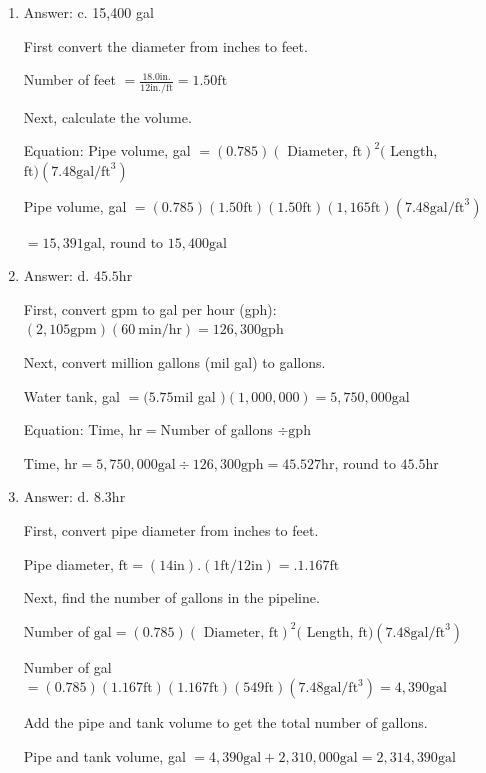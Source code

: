 \documentclass[10pt]{article}
\begin{document}
\begin{enumerate}
  \item Answer: c. 15,400 gal

First convert the diameter from inches to feet.

Number of feet $=\frac{18.0 \mathrm{in} .}{12 \mathrm{in} . / \mathrm{ft}}=1.50 \mathrm{ft}$

Next, calculate the volume.

Equation: Pipe volume, gal $=(0.785)(\text { Diameter, } \mathrm{ft})^{2}($ Length, $\mathrm{ft})\left(7.48 \mathrm{gal} / \mathrm{ft}^{3}\right)$

Pipe volume, gal $=(0.785)(1.50 \mathrm{ft})(1.50 \mathrm{ft})(1,165 \mathrm{ft})\left(7.48 \mathrm{gal} / \mathrm{ft}^{3}\right)$

$=15,391 \mathrm{gal}$, round to $15,400 \mathrm{gal}$

  \item Answer: d. $45.5 \mathrm{hr}$

First, convert gpm to gal per hour (gph): $(2,105 \mathrm{gpm})(60 \mathrm{~min} / \mathrm{hr})=126,300 \mathrm{gph}$

Next, convert million gallons (mil gal) to gallons.

Water tank, gal $=(5.75 \mathrm{mil}$ gal $)(1,000,000)=5,750,000 \mathrm{gal}$

Equation: Time, $\mathrm{hr}=\mathrm{Number}$ of gallons $\div \mathrm{gph}$

Time, $\mathrm{hr}=5,750,000 \mathrm{gal} \div 126,300 \mathrm{gph}=45.527 \mathrm{hr}$, round to $45.5 \mathrm{hr}$ 

  \item Answer: d. $8.3 \mathrm{hr}$

First, convert pipe diameter from inches to feet.

Pipe diameter, $\mathrm{ft}=(14 \mathrm{in}).(1 \mathrm{ft} / 12 \mathrm{in})=.1.167 \mathrm{ft}$

Next, find the number of gallons in the pipeline.

Number of $\mathrm{gal}=(0.785)(\text { Diameter, } \mathrm{ft})^{2}($ Length, $\mathrm{ft})\left(7.48 \mathrm{gal} / \mathrm{ft}^{3}\right)$

Number of gal $=(0.785)(1.167 \mathrm{ft})(1.167 \mathrm{ft})(549 \mathrm{ft})\left(7.48 \mathrm{gal} / \mathrm{ft}^{3}\right)=4,390 \mathrm{gal}$

Add the pipe and tank volume to get the total number of gallons.

Pipe and tank volume, gal $=4,390 \mathrm{gal}+2,310,000 \mathrm{gal}=2,314,390 \mathrm{gal}$


\end{enumerate}
\end{document}
